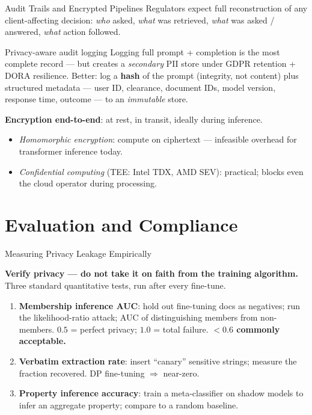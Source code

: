 \documentclass[9pt,t]{beamer}
\begin{document}
\begin{frame}{Audit Trails and Encrypted Pipelines}
Regulators expect full reconstruction of any client-affecting decision: \emph{who}
asked, \emph{what} was retrieved, \emph{what} was asked / answered, \emph{what} action followed.

\medskip
\begin{exampleblock}{Privacy-aware audit logging}
Logging full prompt + completion is the most complete record --- but creates a
\emph{secondary} PII store under GDPR retention + DORA resilience. Better: log a
\textbf{hash} of the prompt (integrity, not content) plus structured metadata ---
user ID, clearance, document IDs, model version, response time, outcome --- to an
\emph{immutable} store.
\end{exampleblock}

\medskip
\textbf{Encryption end-to-end}: at rest, in transit, ideally during inference.
\begin{itemize}
  \item \emph{Homomorphic encryption}: compute on ciphertext --- infeasible overhead
        for transformer inference today.
  \item \emph{Confidential computing} (TEE: Intel TDX, AMD SEV): practical;
        blocks even the cloud operator during processing.
\end{itemize}
\end{frame}

\section{Evaluation and Compliance}

\begin{frame}{Measuring Privacy Leakage Empirically}
\begin{bigpicture}
\textbf{Verify privacy --- do not take it on faith from the training algorithm.}
Three standard quantitative tests, run after every fine-tune.
\end{bigpicture}

\medskip
\begin{enumerate}
  \item \textbf{Membership inference AUC}: hold out fine-tuning docs as negatives; run
        the likelihood-ratio attack; AUC of distinguishing members from non-members.
        $0.5$ = perfect privacy; $1.0$ = total failure. \textbf{$<0.6$ commonly
        acceptable.}
  \item \textbf{Verbatim extraction rate}: insert ``canary'' sensitive strings; measure
        the fraction recovered. DP fine-tuning $\Rightarrow$ near-zero.
  \item \textbf{Property inference accuracy}: train a meta-classifier on shadow models
        to infer an aggregate property; compare to a random baseline.
\end{enumerate}
\end{frame}
\end{document}
